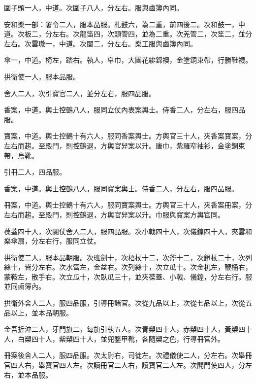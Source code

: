 \begin{pinyinscope}
 圍子頭一人，中道。次圍子八人，分左右。服與鹵簿內同。



 安和樂一部：署令二人，服本品服。札鼓六，為二重，前四後二。次和鼓一，中道。次板二，分左右。次龍笛四，次頭管四，並為二重。次羌管二，次笙二，並分左右。次雲璈一，中道。次闉二，分左右。樂工服與鹵簿內同。



 傘一，中道。椅左，踏右。執人，皁巾，大團花緋錦襖，金塗銅束帶，行縢鞋襪。



 拱衛使一人，服本品服。



 舍人二人，次引寶官二人，並分左右，服四品服。



 香案，中道。輿士控鶴八人，服同立仗內表案輿士。侍香二人，分左右，服四品服。



 寶案，中道。輿士控鶴十有六人，服同香案輿士。方輿官三十人，夾香案寶案，分左右而趨。至殿門，則控鶴退，方輿官舁案以升。唐巾，紫羅窄袖衫，金塗銅束帶，烏靴。



 引冊二人，四品服。



 香案，中道。輿士控鶴八人，服同寶案輿士。侍香二人，分左右，服四品服。



 冊案，中道。輿士控鶴十有六人，服同寶案輿士。方輿官三十人，夾香案冊案，分左右而趨。至殿門，則控鶴退，方輿官舁案以升。巾服與寶案方輿官同。



 葆蓋四十人，次閱仗舍人二人，服四品服。次小戟四十人，次儀鍠四十人，夾雲和樂傘扇，分左右行，服同立仗。



 拱衛使二人，服本品朝服。次班劍十，次梧杖十二，次斧十二，次鐙杖二十，次列絲十，皆分左右。次水簹左，金盆右。次列絲十，次立瓜十。次金杌左，鞭桶右，蒙鞍左，散手右。次立瓜十，次臥瓜三十，並夾葆蓋、小戟、儀鍠，分左右行。服並同鹵簿內。



 拱衛外舍人二人，服四品服，引導冊諸官。次從九品以上，次從七品以上，次從五品以上，並本品朝服。



 金吾折沖二人，牙門旗二，每旗引執五人。次青槊四十人，赤槊四十人，黃槊四十人，白槊四十人，紫槊四十人，並兜鍪甲靴，各隨槊之色，行導冊官外。



 冊案後舍人二人，服四品服。次太尉右，司徒左。次禮儀使二人，分左右。次舉冊官四人右，舉寶官四人左。次讀冊官二人右，讀寶官二人左。次閣門使四人，分左右，並本品服。




\end{pinyinscope}
